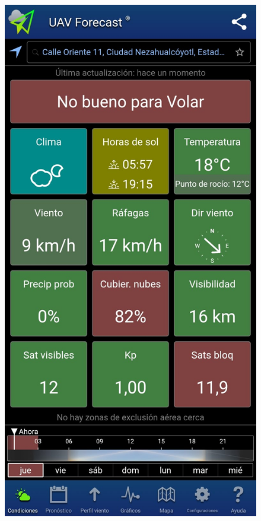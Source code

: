 \begin{figure}[htbp]
	\centering
	\begin{minipage}[b]{0.3\textwidth}
		\centering
		\includegraphics[width=\textwidth]{imagenes/app1}

\end{minipage}
\end{figure}
